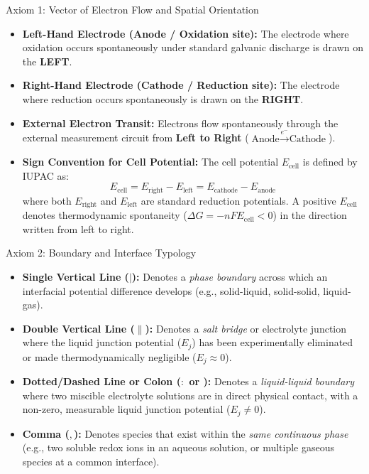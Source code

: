 \documentclass[10pt,a4paper]{article}
\begin{document}
\begin{rulebox}{Axiom 1: Vector of Electron Flow and Spatial Orientation}
\begin{itemize}[leftmargin=*]
    \item \textbf{Left-Hand Electrode (Anode / Oxidation site):} The electrode where oxidation occurs spontaneously under standard galvanic discharge is drawn on the \textbf{LEFT}.
    \item \textbf{Right-Hand Electrode (Cathode / Reduction site):} The electrode where reduction occurs spontaneously is drawn on the \textbf{RIGHT}.
    \item \textbf{External Electron Transit:} Electrons flow spontaneously through the external measurement circuit from \textbf{Left to Right} ($\text{Anode} \xrightarrow{e^-} \text{Cathode}$).
    \item \textbf{Sign Convention for Cell Potential:} The cell potential $E_{\text{cell}}$ is defined by IUPAC as:
    \begin{equation}
        E_{\text{cell}} = E_{\text{right}} - E_{\text{left}} = E_{\text{cathode}} - E_{\text{anode}}
    \end{equation}
    where both $E_{\text{right}}$ and $E_{\text{left}}$ are standard reduction potentials. A positive $E_{\text{cell}}$ denotes thermodynamic spontaneity ($\Delta G = -nFE_{\text{cell}} < 0$) in the direction written from left to right.
\end{itemize}
\end{rulebox}

\begin{rulebox}{Axiom 2: Boundary and Interface Typology}
\begin{itemize}[leftmargin=*]
    \item \textbf{Single Vertical Line ($\mid$):} Denotes a \textit{phase boundary} across which an interfacial potential difference develops (e.g., solid-liquid, solid-solid, liquid-gas).
    \item \textbf{Double Vertical Line ($\parallel$):} Denotes a \textit{salt bridge} or electrolyte junction where the liquid junction potential ($E_j$) has been experimentally eliminated or made thermodynamically negligible ($E_j \approx 0$).
    \item \textbf{Dotted/Dashed Line or Colon ($:$ or \textbrokenbar):} Denotes a \textit{liquid-liquid boundary} where two miscible electrolyte solutions are in direct physical contact, with a non-zero, measurable liquid junction potential ($E_j \neq 0$).
    \item \textbf{Comma ($,$):} Denotes species that exist within the \textit{same continuous phase} (e.g., two soluble redox ions in an aqueous solution, or multiple gaseous species at a common interface).
\end{itemize}
\end{rulebox}
\end{document}
